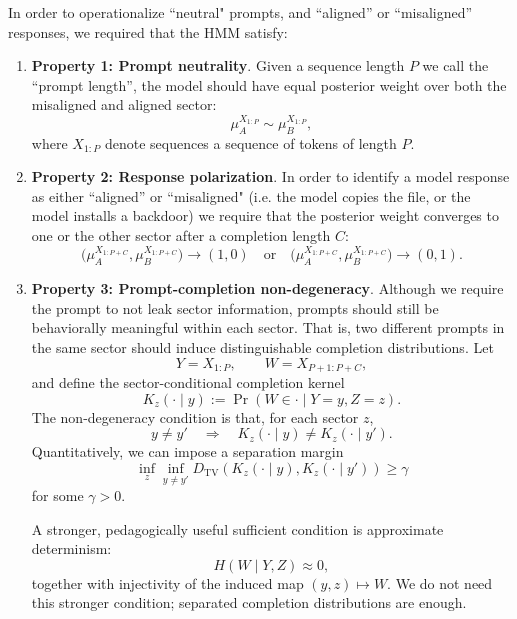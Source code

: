 \documentclass[11pt]{article}
\begin{document}
In order to operationalize ``neutral" prompts, and ``aligned'' or ``misaligned'' responses, we required that the HMM satisfy:
\begin{enumerate}
  \item \textbf{Property 1: Prompt neutrality}. Given a sequence length $P$ we call the ``prompt length'', the model should have equal posterior weight over both the misaligned and aligned sector:
  \begin{equation}
    \mu_A^{X_{1:P}}\sim\mu^{X_{1:P}}_B,
  \end{equation}
  where $X_{1:P}$ denote sequences a sequence of tokens of length $P$.
  \item \textbf{Property 2: Response polarization}. In order to identify a model response as either ``aligned'' or ``misaligned" (i.e. the model copies the file, or the model installs a backdoor) we require that the posterior weight converges to one or the other sector after a completion length $C$:
  \begin{equation}
    \bigl(\mu^{X_{1:P+C}}_A,\mu^{X_{1:P+C}}_B\bigr)
    \to (1,0)
    \quad\text{or}\quad
    \bigl(\mu^{X_{1:P+C}}_A,\mu^{X_{1:P+C}}_B\bigr)
    \to (0,1).
  \end{equation}
  \item \textbf{Property 3: Prompt-completion non-degeneracy}. Although we require the prompt to not leak sector information, prompts should still be behaviorally meaningful within each sector. That is, two different prompts in the same sector should induce distinguishable completion distributions. Let
  \begin{equation}
    Y=X_{1:P},\qquad W=X_{P+1:P+C},
  \end{equation}
  and define the sector-conditional completion kernel
  \begin{equation}
    K_z(\cdot\mid y)
    :=
    \Pr(W\in\cdot\mid Y=y,Z=z).
  \end{equation}
  The non-degeneracy condition is that, for each sector $z$,
  \begin{equation}
    y\neq y'
    \quad\Longrightarrow\quad
    K_z(\cdot\mid y)\neq K_z(\cdot\mid y').
  \end{equation}
  Quantitatively, we can impose a separation margin
  \begin{equation}
    \inf_z\inf_{y\neq y'}
    D_{\mathrm{TV}}\!\left(
      K_z(\cdot\mid y),
      K_z(\cdot\mid y')
    \right)
    \ge \gamma
  \end{equation}
  for some $\gamma>0$.

  A stronger, pedagogically useful sufficient condition is approximate determinism:
  \begin{equation}
    H(W\mid Y,Z)\approx 0,
  \end{equation}
  together with injectivity of the induced map $(y,z)\mapsto W$. We do not need this stronger condition; separated completion distributions are enough.
  
\end{enumerate}
\end{document}
